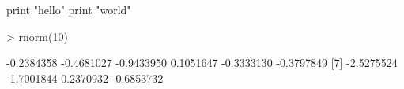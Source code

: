 \documentclass{article}
\begin{document}
\begin{python}
print "hello"
print "world"
\end{python}

\begin{Schunk}
\begin{Sinput}
> rnorm(10)
\end{Sinput}
\begin{Soutput}
 [1] -0.2384358 -0.4681027 -0.9433950  0.1051647 -0.3333130 -0.3797849
 [7] -2.5275524 -1.7001844  0.2370932 -0.6853732
\end{Soutput}
\end{Schunk}
\end{document}
